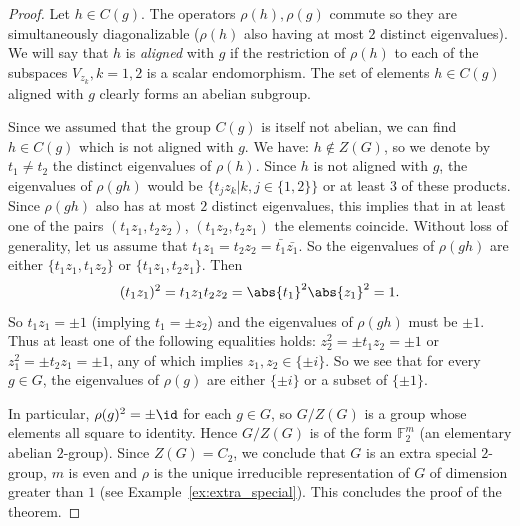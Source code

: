 \begin{proof}
Let $h\in C(g)$. The operators $\rho(h), \rho(g)$ commute so they are simultaneously diagonalizable ($\rho(h)$ also having at most $2$ distinct eigenvalues). We will say that $h$ is {\it aligned} with $g$ if the restriction of $\rho(h)$ to each of the subspaces $V_{z_k}, k=1,2$ is a scalar endomorphism. The set of elements $h\in C(g)$ aligned with $g$ clearly forms an abelian subgroup.

Since we assumed that the group $C(g)$ is itself not abelian, we can find $h \in C(g)$ which is not aligned with $g$. We have: $h\notin Z(G)$, so we denote by $t_1 \neq t_2$ the distinct eigenvalues of $\rho(h)$. Since $h$ is not aligned with $g$, the eigenvalues of $\rho(gh)$ would be $\{t_j z_k |k, j\in \{1,2\}\}$ or at least $3$ of these products. {Since $\rho(gh)$ also has at most $2$ distinct eigenvalues, this} implies that in at least one of the pairs $(t_1 z_1, t_2 z_2)$, $(t_1 z_2, t_2 z_1)$ the elements coincide. {Without loss of generality, let us assume that $t_1z_1 = t_2z_2 = \bar{t_1}\bar{z_1}$. So the eigenvalues of $\rho(gh)$ are either $\{t_1z_1, t_1z_2\}$ or $\{t_1z_1, t_2z_1\}$. Then $$ (t_1 z_1)^2= t_1 z_1 t_2 z_2 =\abs{t_1}^2 \abs{z_1}^2 = 1 .$$ 
So $t_1z_1 = \pm 1$ (implying $t_1 = \pm z_2$) and the eigenvalues of $\rho(gh)$ must be $\pm 1$. Thus at least one of the following equalities holds: $ z_2^2 = \pm t_1 z_2 = \pm 1$ or $z_1^2 = \pm t_2 z_1 = \pm 1$, any of which implies} $z_1, z_2 \in \{\pm i\}$. So we see that for every $g\in G$, the eigenvalues of $\rho(g)$ are either $\{\pm i\}$ or a subset of $\{\pm 1\}$.

In particular, $\rho(g)^2 = \pm \id$ for each $g\in G$, so $G/Z(G)$ is a group {whose elements all square to identity}. {Hence $G/Z(G)$ is} of the form $\mathbb{F}_2^m$ (an elementary abelian $2$-group). Since $Z(G)=C_2$, we conclude that $G$ is an extra special $2$-group, $m$ is even and $\rho$ is the unique irreducible representation of $G$ of dimension greater than $1$ (see Example~\ref{ex:extra_special}). This concludes the proof of the theorem.

\end{proof}
